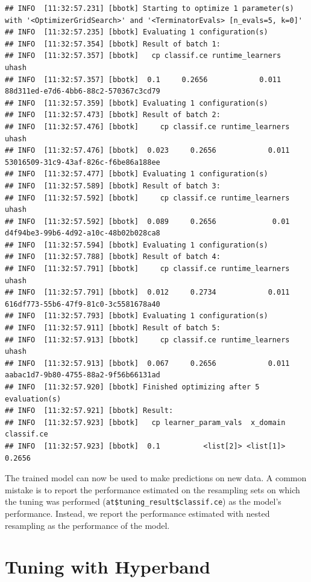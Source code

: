 \documentclass[
]{scrbook}
\begin{document}
\begin{verbatim}
## INFO  [11:32:57.231] [bbotk] Starting to optimize 1 parameter(s) with '<OptimizerGridSearch>' and '<TerminatorEvals> [n_evals=5, k=0]' 
## INFO  [11:32:57.235] [bbotk] Evaluating 1 configuration(s) 
## INFO  [11:32:57.354] [bbotk] Result of batch 1: 
## INFO  [11:32:57.357] [bbotk]   cp classif.ce runtime_learners                                uhash 
## INFO  [11:32:57.357] [bbotk]  0.1     0.2656            0.011 88d311ed-e7d6-4bb6-88c2-570367c3cd79 
## INFO  [11:32:57.359] [bbotk] Evaluating 1 configuration(s) 
## INFO  [11:32:57.473] [bbotk] Result of batch 2: 
## INFO  [11:32:57.476] [bbotk]     cp classif.ce runtime_learners                                uhash 
## INFO  [11:32:57.476] [bbotk]  0.023     0.2656            0.011 53016509-31c9-43af-826c-f6be86a188ee 
## INFO  [11:32:57.477] [bbotk] Evaluating 1 configuration(s) 
## INFO  [11:32:57.589] [bbotk] Result of batch 3: 
## INFO  [11:32:57.592] [bbotk]     cp classif.ce runtime_learners                                uhash 
## INFO  [11:32:57.592] [bbotk]  0.089     0.2656             0.01 d4f94be3-99b6-4d92-a10c-48b02b028ca8 
## INFO  [11:32:57.594] [bbotk] Evaluating 1 configuration(s) 
## INFO  [11:32:57.788] [bbotk] Result of batch 4: 
## INFO  [11:32:57.791] [bbotk]     cp classif.ce runtime_learners                                uhash 
## INFO  [11:32:57.791] [bbotk]  0.012     0.2734            0.011 616df773-55b6-47f9-81c0-3c5581678a40 
## INFO  [11:32:57.793] [bbotk] Evaluating 1 configuration(s) 
## INFO  [11:32:57.911] [bbotk] Result of batch 5: 
## INFO  [11:32:57.913] [bbotk]     cp classif.ce runtime_learners                                uhash 
## INFO  [11:32:57.913] [bbotk]  0.067     0.2656            0.011 aabac1d7-9b80-4755-88a2-9f56b66131ad 
## INFO  [11:32:57.920] [bbotk] Finished optimizing after 5 evaluation(s) 
## INFO  [11:32:57.921] [bbotk] Result: 
## INFO  [11:32:57.923] [bbotk]   cp learner_param_vals  x_domain classif.ce 
## INFO  [11:32:57.923] [bbotk]  0.1          <list[2]> <list[1]>     0.2656
\end{verbatim}

The trained model can now be used to make predictions on new data.
A common mistake is to report the performance estimated on the resampling sets on which the tuning was performed (\texttt{at\$tuning\_result\$classif.ce}) as the model's performance.
Instead, we report the performance estimated with nested resampling as the performance of the model.

\hypertarget{hyperband}{%
\section{Tuning with Hyperband}\label{hyperband}}
\end{document}
